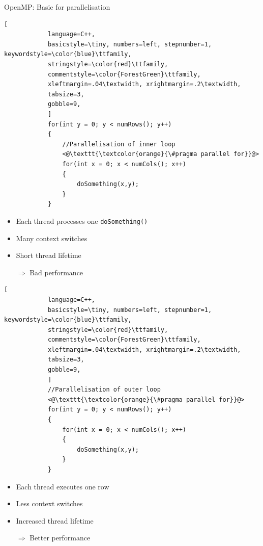 \documentclass[shortpres,usenames,dvipsnames]{beamer}
\begin{document}
\begin{frame}[containsverbatim]{OpenMP: Basic for parallelisation}
	\begin{multicols}{2}
		\begin{lstlisting}[
			language=C++,
			basicstyle=\tiny, numbers=left, stepnumber=1, keywordstyle=\color{blue}\ttfamily,
			stringstyle=\color{red}\ttfamily,
			commentstyle=\color{ForestGreen}\ttfamily,
			xleftmargin=.04\textwidth, xrightmargin=.2\textwidth,
			tabsize=3,
			gobble=9,
			]
			for(int y = 0; y < numRows(); y++)
			{
				//Parallelisation of inner loop
				<@\texttt{\textcolor{orange}{\#pragma parallel for}}@>
				for(int x = 0; x < numCols(); x++)
				{
					doSomething(x,y);
				}
			}
		\end{lstlisting}
			
		\begin{itemize}
			\item Each thread processes one \verb|doSomething()|
			\item Many context switches
			\item Short thread lifetime
			\item[$\Rightarrow$] Bad performance 
		\end{itemize}
		
	\columnbreak
	
		\begin{lstlisting}[
			language=C++,
			basicstyle=\tiny, numbers=left, stepnumber=1, keywordstyle=\color{blue}\ttfamily,
			stringstyle=\color{red}\ttfamily,
			commentstyle=\color{ForestGreen}\ttfamily,
			xleftmargin=.04\textwidth, xrightmargin=.2\textwidth,
			tabsize=3,
			gobble=9,
			]
			//Parallelisation of outer loop
			<@\texttt{\textcolor{orange}{\#pragma parallel for}}@>
			for(int y = 0; y < numRows(); y++)
			{
				for(int x = 0; x < numCols(); x++)
				{
					doSomething(x,y);
				}
			}
		\end{lstlisting}
		
		\begin{itemize}
			\item Each thread executes one row
			\item Less context switches
			\item Increased thread lifetime
			\item[$\Rightarrow$] Better performance
		\end{itemize}
	\end{multicols}
\end{frame}
\end{document}
